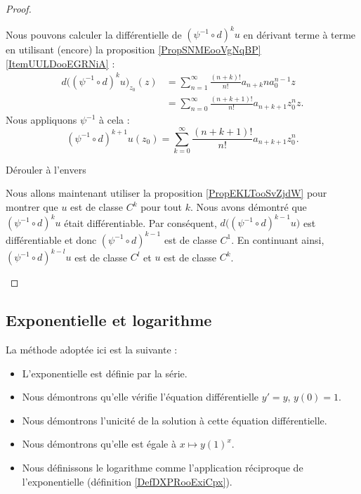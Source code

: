 \begin{proof}
\begin{subproof}
        Nous pouvons calculer la différentielle de \( (\psi^{-1}\circ d)^ku\) en dérivant terme à terme en utilisant (encore) la proposition \ref{PropSNMEooVgNqBP}\ref{ItemUULDooEGRNiA} :
        \begin{subequations}
            \begin{align}
                d\big( (\psi^{-1}\circ d)^k u\big)_{z_0}(z)&=\sum_{n=1}^{\infty}\frac{ (n+k)! }{ n! }a_{n+k}na_{0}^{n-1}z\\
                &=\sum_{n=0}^{\infty}\frac{ (n+k+1)! }{ n! }a_{n+k+1}z_{0}^nz.
            \end{align}
        \end{subequations}
        Nous appliquons \( \psi^{-1}\) à cela :
        \begin{equation}
            (\psi^{-1}\circ d)^{k+1}u(z_0)=\sum_{k=0}^{\infty}\frac{ (n+k+1)! }{ n! }a_{n+k+1}z_0^n.
        \end{equation}
        
    \item[Dérouler à l'envers]

        Nous allons maintenant utiliser la proposition \ref{PropEKLTooSvZjdW} pour montrer que \( u\) est de classe \( C^k\) pour tout \( k\). Nous avons démontré que \( (\psi^{-1}\circ d)^ku\) était différentiable. Par conséquent, \( d\big( (\psi^{-1}\circ d)^{k-1}u \big)\) est différentiable et donc \( (\psi^{-1}\circ d)^{k-1}\) est de classe \( C^1\). En continuant ainsi, \( (\psi^{-1}\circ d)^{k-l}u\) est de classe \( C^l\) et \( u\) est de classe \( C^k\).
    \end{subproof}
\end{proof}

\subsection{Exponentielle et logarithme}

La méthode adoptée ici est la suivante :
\begin{itemize}
    \item L'exponentielle est définie par la série.
    \item Nous démontrons qu'elle vérifie l'équation différentielle \( y'=y\), \( y(0)=1\).
    \item Nous démontrons l'unicité de la solution à cette équation différentielle.
    \item Nous démontrons qu'elle est égale à \( x\mapsto y(1)^x\).
    \item Nous définissons le logarithme comme l'application réciproque de l'exponentielle (définition \ref{DefDXPRooExiCpx}).
\end{itemize}

